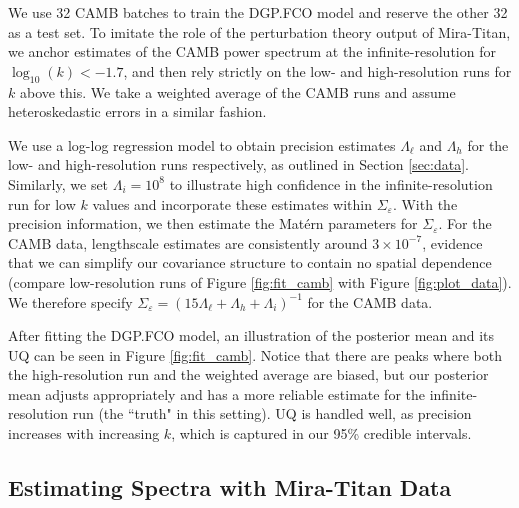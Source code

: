 \documentclass[11pt]{article}
\begin{document}
We use 32 CAMB batches to train the DGP.FCO model and reserve the other 32 as a test set.
To imitate the role of the perturbation theory output of Mira-Titan, we anchor estimates of the CAMB
power spectrum at the infinite-resolution for $\log_{10}(k) < -1.7$, and then rely 
strictly on the low- and high-resolution runs for $k$ above this. We take a weighted
average of the CAMB runs and assume heteroskedastic errors in a similar fashion. 

We use a log-log regression model to obtain precision estimates $\Lambda_\ell$ and $\Lambda_h$
for the low- and high-resolution runs respectively, as outlined in Section \ref{sec:data}. 
Similarly, we set $\Lambda_i=10^8$ to illustrate high confidence in the infinite-resolution 
run for low $k$ values and incorporate these estimates within $\Sigma_\varepsilon$. 
With the precision information, we then estimate the Mat\'ern parameters for 
$\Sigma_\varepsilon$. For the CAMB data, lengthscale estimates are consistently 
around $3\times 10^{-7}$, evidence that we can simplify our covariance structure 
to contain no spatial dependence (compare low-resolution runs of Figure \ref{fig:fit_camb} 
with Figure \ref{fig:plot_data}). We therefore specify $\Sigma_\varepsilon = 
(15\Lambda_\ell+\Lambda_h+\Lambda_i)^{-1}$ for the CAMB data.  

After fitting the DGP.FCO model, an illustration of the posterior mean and its UQ can
be seen in Figure \ref{fig:fit_camb}. Notice that there are peaks where both the high-resolution
run and the weighted average are biased, but our posterior mean adjusts appropriately 
and has a more reliable estimate for the infinite-resolution run (the ``truth" in this setting). 
UQ is handled well, as precision increases with increasing $k$, which is captured in our
95\% credible intervals.

\subsection{Estimating Spectra with Mira-Titan Data}
\label{subsec:mira_fit}
\end{document}
